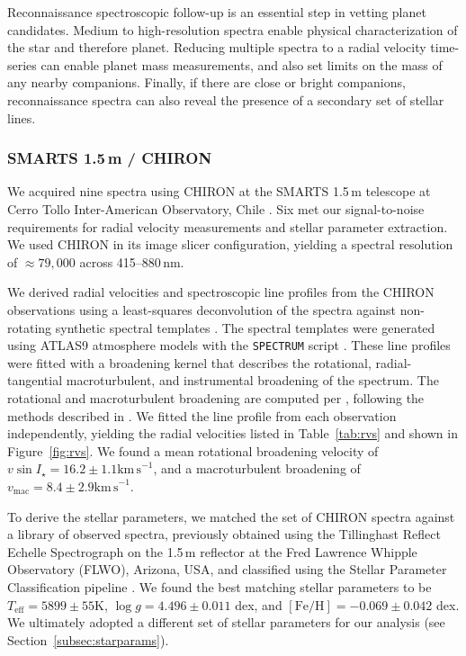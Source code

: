 \documentclass[12pt,twocolumn,tighten]{aastex63}
\begin{document}
Reconnaissance spectroscopic follow-up is an essential step in vetting
planet candidates.  Medium to high-resolution spectra enable physical
characterization of the star and therefore planet.  Reducing multiple
spectra to a radial velocity time-series can enable planet mass
measurements, and also set limits on the mass of any nearby
companions.  Finally, if there are close or bright companions,
reconnaissance spectra can also reveal the presence of a secondary set
of stellar lines.

\subsubsection{SMARTS 1.5$\,$m / CHIRON}
\label{subsec:chiron}

We acquired nine spectra using CHIRON at the SMARTS 1.5$\,$m telescope
at Cerro Tollo Inter-American Observatory, Chile
\citep{tokovinin_chironfiber_2013}.  Six met our signal-to-noise
requirements for radial velocity measurements and stellar parameter
extraction.  We used CHIRON in its image slicer configuration,
yielding a spectral resolution of $\approx 79{,}000$ across
415--880$\,$nm.

We derived radial velocities and spectroscopic line profiles from the
CHIRON observations using a least-squares deconvolution of the spectra
against non-rotating synthetic spectral templates
\citep{donati_1997_spectropolarimetric}. The spectral templates were
generated using ATLAS9 atmosphere models \citep{Castelli:2004} with
the \texttt{SPECTRUM} script \citep{gray_1994_spectrum}. These line
profiles were fitted with a broadening kernel that describes the
rotational, radial-tangential macroturbulent, and instrumental
broadening of the spectrum. The rotational and macroturbulent
broadening are computed per \citet{gray_2005_book}, following the
methods described in \citet{zhou_2018_hd106315obliq}. We fitted the
line profile from each observation independently, yielding the radial
velocities listed in Table~\ref{tab:rvs} and shown in
Figure~\ref{fig:rvs}. We found a mean rotational broadening velocity
of $v\sin I_\star = 16.2 \pm 1.1 \mathrm{km\,s}^{-1}$, and a
macroturbulent broadening of $v_\mathrm{mac} = 8.4 \pm 2.9
\mathrm{km\,s}^{-1}$.

To derive the stellar parameters, we matched the set of CHIRON spectra
against a library of observed spectra, previously obtained using the
Tillinghast Reflect Echelle Spectrograph
\citep[TRES,][]{furesz_tres_2008} on the 1.5\,m reflector at the Fred
Lawrence Whipple Observatory (FLWO), Arizona, USA, and classified
using the Stellar Parameter Classification pipeline
\citep{buchhave_hatp16b_class_2010}.  We found the best matching
stellar parameters to be $T_\mathrm{eff} = 5899 \pm 55$K, $\log g =
4.496 \pm 0.011$ dex, and $\mathrm{[Fe/H]} = -0.069 \pm 0.042$ dex.
We ultimately adopted a different set of stellar parameters for our
analysis (see Section~\ref{subsec:starparams}).
\end{document}
